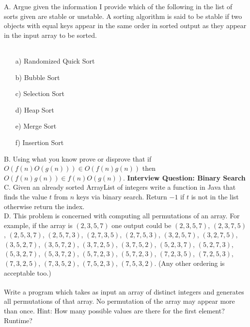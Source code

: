 \documentclass[12pt]{article}
\begin{document}
\noindent A. Argue given the information I provide which of the following in the list of sorts given are stable or unstable. A sorting algorithm is said to be stable if two objects with equal keys appear in the same order in sorted output as they appear in the input array to be sorted.\\\\
\begin{enumerate}
    \item[a)]Randomized Quick Sort
    \item[b)]Bubble Sort
    \item[c)]Selection Sort
    \item[d)]Heap Sort
    \item[e)]Merge Sort
    \item[f)]Insertion Sort
\end{enumerate}
\noindent B. Using what you know prove or disprove that if $O(f(n)O(g(n)))\in O(f(n)g(n))$ then $O(f(n)g(n)) \in f(n)O(g(n))$.
\newpage
\noindent\textbf{Interview Question: Binary Search}\\
\noindent C. Given an already sorted ArrayList of integers write a function in Java that finds the value $t$ from $n$ keys via binary search. Return $-1$ if $t$ is not in the list otherwise return the index.\\
\newpage
\noindent D. This problem is concerned with computing all permutations of an array. For example,
if the array is $(2,3,5, 7)$ one output could be $(2,3,5, 7)$, $(2,3,7,5)$, $(2,5,3, 7)$, $(2,5, 7,3)$,
$(2,7,3,5)$, $(2,7,5,3)$, $(3,2,5,7)$, $(3,2,7,5)$, $(3,5,2,7)$, $(3,5,7,2)$, $(3,7,2,5)$, $(3,7,5,2)$,
$(5, 2,3, 7)$, $(5,2,7,3)$, $(5,3,2,7)$, $(5,3,7,2)$, $(5,7,2,3)$, $(5,7,2,3)$, $(7,2,3,5)$, $(7,2,5,3)$,
$(7,3, 2,5)$, $(7,3,5, 2)$, $(7,5, 2,3)$, $(7,5,3, 2)$. (Any other ordering is acceptable too.)\\\\
Write a program which takes as input an array of distinct integers and generates all
permutations of that array. No permutation of the array may appear more than once.
Hint: How many possible values are there for the first element? Runtime?\\
\end{document}
